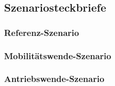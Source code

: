 
\subsection{Szenariosteckbriefe}

\subsubsection{Referenz-Szenario}

\subsubsection{Mobilitätswende-Szenario}

\subsubsection{Antriebswende-Szenario}